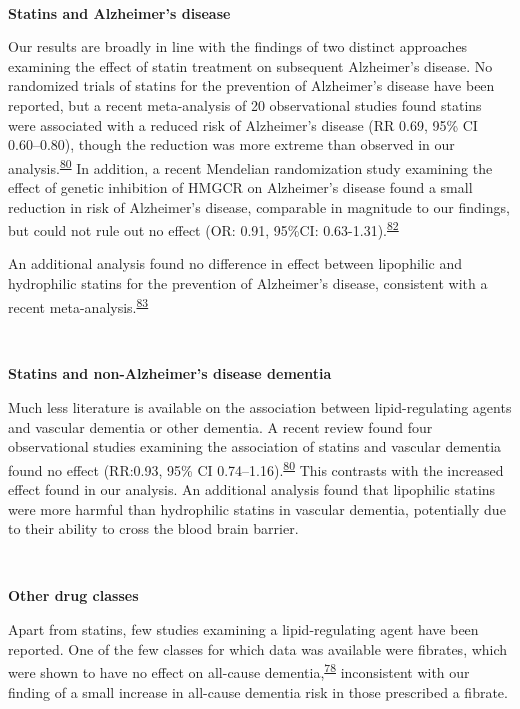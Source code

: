 \documentclass[a4paper, twoside]{templates/ociamthesis}
\begin{document}
~

\textbf{Statins and Alzheimer's disease}

Our results are broadly in line with the findings of two distinct approaches examining the effect of statin treatment on subsequent Alzheimer's disease. No randomized trials of statins for the prevention of Alzheimer's disease have been reported, but a recent meta-analysis of 20 observational studies found statins were associated with a reduced risk of Alzheimer's disease (RR 0.69, 95\% CI 0.60--0.80), though the reduction was more extreme than observed in our analysis.\textsuperscript{\protect\hyperlink{ref-poly2020}{80}} In addition, a recent Mendelian randomization study examining the effect of genetic inhibition of HMGCR on Alzheimer's disease found a small reduction in risk of Alzheimer's disease, comparable in magnitude to our findings, but could not rule out no effect (OR: 0.91, 95\%CI: 0.63-1.31).\textsuperscript{\protect\hyperlink{ref-williams}{82}}

An additional analysis found no difference in effect between lipophilic and hydrophilic statins for the prevention of Alzheimer's disease, consistent with a recent meta-analysis.\textsuperscript{\protect\hyperlink{ref-chu2018}{83}}

~

\textbf{Statins and non-Alzheimer's disease dementia}

Much less literature is available on the association between lipid-regulating agents and vascular dementia or other dementia. A recent review found four observational studies examining the association of statins and vascular dementia found no effect (RR:0.93, 95\% CI 0.74--1.16).\textsuperscript{\protect\hyperlink{ref-poly2020}{80}} This contrasts with the increased effect found in our analysis. An additional analysis found that lipophilic statins were more harmful than hydrophilic statins in vascular dementia, potentially due to their ability to cross the blood brain barrier.

~

\textbf{Other drug classes}

Apart from statins, few studies examining a lipid-regulating agent have been reported. One of the few classes for which data was available were fibrates, which were shown to have no effect on all-cause dementia,\textsuperscript{\protect\hyperlink{ref-ancelin2012}{78}} inconsistent with our finding of a small increase in all-cause dementia risk in those prescribed a fibrate.
\end{document}
